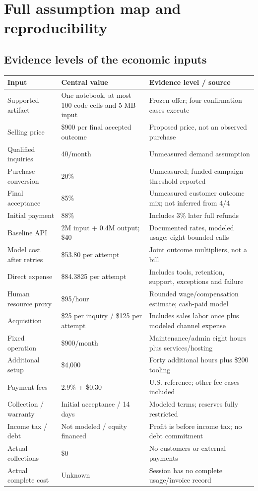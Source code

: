 \clearpage
\section{Full assumption map and reproducibility}
\subsection{Evidence levels of the economic inputs}
\begin{longtable}{@{}p{.27\linewidth}p{.29\linewidth}p{.37\linewidth}@{}}
\toprule
Input & Central value & Evidence level / source\\\midrule
\endhead
Supported artifact & One notebook, at most 100 code cells and 5 MB input & Frozen offer; four confirmation cases execute\\
Selling price & \$900 per final accepted outcome & Proposed price, not an observed purchase\\
Qualified inquiries & 40/month & Unmeasured demand assumption\\
Purchase conversion & 20\% & Unmeasured; funded-campaign threshold reported\\
Final acceptance & 85\% & Unmeasured customer outcome mix; not inferred from 4/4\\
Initial payment & 88\% & Includes 3\% later full refunds\\
Baseline API & 2M input + 0.4M output; \$40 & Documented rates, modeled usage; eight bounded calls\\
Model cost after retries & \$53.80 per attempt & Joint outcome multipliers, not a bill\\
Direct expense & \$84.3825 per attempt & Includes tools, retention, support, exceptions and failure\\
Human resource proxy & \$95/hour & Rounded wage/compensation estimate; cash-paid model\\
Acquisition & \$25 per inquiry / \$125 per attempt & Includes sales labor once plus modeled channel expense\\
Fixed operation & \$900/month & Maintenance/admin eight hours plus services/hosting\\
Additional setup & \$4,000 & Forty additional hours plus \$200 tooling\\
Payment fees & 2.9\% + \$0.30 & U.S. reference; other fee cases included\\
Collection / warranty & Initial acceptance / 14 days & Modeled terms; reserves fully restricted\\
Income tax / debt & Not modeled / equity financed & Profit is before income tax; no debt commitment\\
Actual collections & \$0 & No customers or external payments\\
Actual complete cost & Unknown & Session has no complete usage/invoice record\\\bottomrule
\end{longtable}

